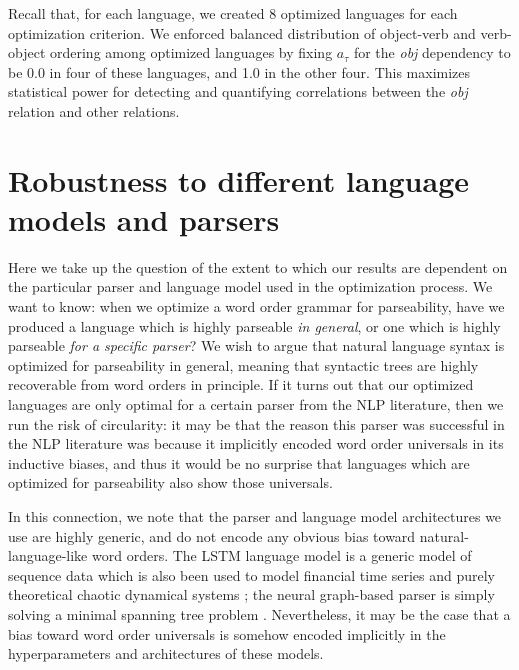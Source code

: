 \documentclass[12pt]{article}
\begin{document}
Recall that, for each language, we created 8 optimized languages for each optimization criterion.
We enforced balanced distribution of object-verb and verb-object ordering among optimized languages by fixing $a_\tau$ for the \textit{obj} dependency to be 0.0 in four of these languages, and 1.0 in the other four.
This maximizes statistical power for detecting and quantifying correlations between the \textit{obj} relation and other relations.





\section{Robustness to different language models and parsers}

Here we take up the question of the extent to which our results are dependent on the particular parser and language model used in the optimization process. We want to know: when we optimize a word order grammar for parseability, have we produced a language which is highly parseable \emph{in general}, or one which is highly parseable \emph{for a specific parser}? We wish to argue that natural language syntax is optimized for parseability in general, meaning that syntactic trees are highly recoverable from word orders in principle. If it turns out that our optimized languages are only optimal for a certain parser from the NLP literature, then we run the risk of circularity: it may be that the reason this parser was successful in the NLP literature was because it implicitly encoded word order universals in its inductive biases, and thus it would be no surprise that languages which are optimized for parseability also show those universals.

In this connection, we note that the parser and language model architectures we use are highly generic, and do not encode any obvious bias toward natural-language-like word orders. The LSTM language model is a generic model of sequence data which is also been used to model financial time series \citep{sirignano2018universal} and purely theoretical chaotic dynamical systems \citep{ogunmolu2016nonlinear}; the neural graph-based parser is simply solving a minimal spanning tree problem \citep{mcdonald2005nonprojective}. Nevertheless, it may be the case that a bias toward word order universals is somehow encoded implicitly in the hyperparameters and architectures of these models.
\end{document}
